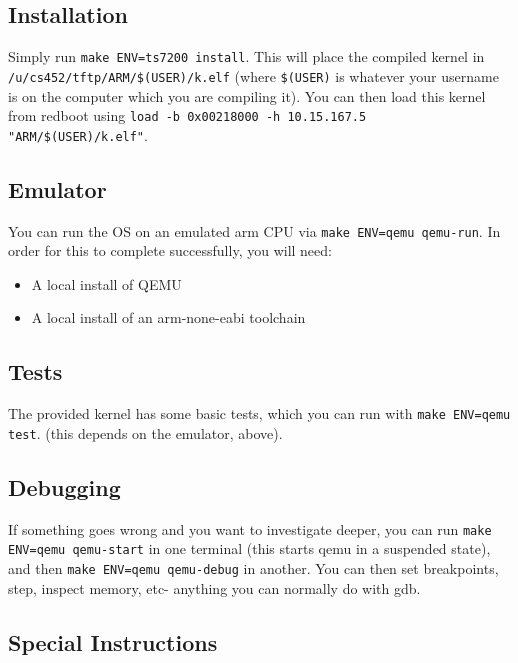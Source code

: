 \subsection{Installation}\label{installation}

Simply run \texttt{make ENV=ts7200 install}. This will place the
compiled kernel in \texttt{/u/cs452/tftp/ARM/\$(USER)/k.elf} (where
\texttt{\$(USER)} is whatever your username is on the computer which you
are compiling it). You can then load this kernel from redboot using
\texttt{load -b 0x00218000 -h 10.15.167.5 "ARM/\$(USER)/k.elf"}.

\subsection{Emulator}\label{emulator}

You can run the OS on an emulated arm CPU via
\texttt{make ENV=qemu qemu-run}. In order for this to complete
successfully, you will need:

\begin{itemize}
\itemsep1pt\parskip0pt
\item
  A local install of QEMU
\item
  A local install of an arm-none-eabi toolchain
\end{itemize}

\subsection{Tests}\label{tests}

The provided kernel has some basic tests, which you can run with
\texttt{make ENV=qemu test}. (this depends on the emulator, above).

\subsection{Debugging}\label{debugging}

If something goes wrong and you want to investigate deeper, you can run
\texttt{make ENV=qemu qemu-start} in one terminal (this starts qemu in a
suspended state), and then \texttt{make ENV=qemu qemu-debug} in another.
You can then set breakpoints, step, inspect memory, etc- anything you
can normally do with gdb.

\subsection{Special Instructions}\label{special-instructions}

